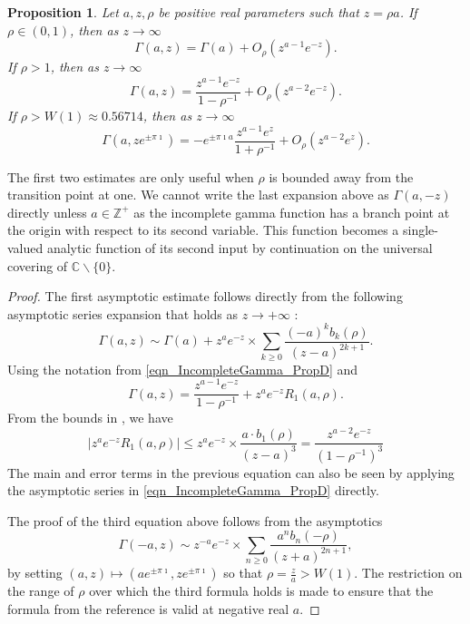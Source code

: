 \documentclass[11pt,reqno,a4letter]{article}
\numberwithin{equation}{section}
\numberwithin{figure}{section}
\numberwithin{table}{section}
\theoremstyle{plain}
\newtheorem{prop}[theorem]{Proposition}
\numberwithin{theorem}{section}
\theoremstyle{definition}
\begin{document}
\begin{prop}
\label{prop_IncGammaLambdaTypeBounds_v1}
Let $a,z,\rho$ be positive real parameters such that $z=\rho a$. 
If $\rho \in (0, 1)$, then as $z \rightarrow \infty$ 
\[
\Gamma(a, z) = \Gamma(a) + O_{\rho}\left(z^{a-1} e^{-z}\right). 
\]
If $\rho > 1$, then as 
$z \rightarrow \infty$ 
\[
\Gamma(a, z) = \frac{z^{a-1} e^{-z}}{1-\rho^{-1}} + O_{\rho}\left(z^{a-2} e^{-z}\right). 
\]
If $\rho > W(1) \approx 0.56714$, then as $z \rightarrow \infty$ 
\[
\Gamma(a, z e^{\pm\pi\imath}) = -e^{\pm \pi\imath a} \frac{z^{a-1} e^{z}}{1 + \rho^{-1}} + 
     O_{\rho}\left(z^{a-2} e^{z}\right). 
\]
\end{prop}
The first two estimates are only useful when $\rho$ is bounded away from the 
transition point at one. 
We cannot write the last expansion above 
as $\Gamma(a, -z)$ directly unless $a \in \mathbb{Z}^{+}$ 
as the incomplete gamma function 
has a branch point at the origin with respect to its second variable. 
This function becomes a single-valued 
analytic function of its second input by continuation 
on the universal covering of $\mathbb{C} \mathbin{\backslash} \{0\}$. 
\begin{proof}
The first asymptotic estimate follows directly from the following 
asymptotic series expansion that holds as $z \rightarrow +\infty$ 
\cite[Eq.\ (2.1)]{NEMES2019}: 
\[
\Gamma(a, z) \sim \Gamma(a) + z^a e^{-z} \times \sum_{k \geq 0} 
     \frac{(-a)^k b_k(\rho)}{(z-a)^{2k+1}}. 
\]
Using the notation from \eqref{eqn_IncompleteGamma_PropD} and \cite{NEMES2016} 
\[
\Gamma(a, z) = \frac{z^{a-1} e^{-z}}{1-\rho^{-1}} + z^{a} e^{-z} R_1(a, \rho). 
\]
From the bounds in \cite[\S 3.1]{NEMES2016}, we have 
\[
\left\lvert z^{a} e^{-z} R_1(a, \rho) \right\rvert \leq 
     z^a e^{-z} \times \frac{a \cdot b_1(\rho)}{(z-a)^{3}} = 
     \frac{z^{a-2} e^{-z}}{(1-\rho^{-1})^{3}}
\]
The main and error terms in the previous equation can also be 
seen by applying the asymptotic series in 
\eqref{eqn_IncompleteGamma_PropD} directly. 

The proof of the third equation above follows from the asymptotics 
\cite[Eq.\ (1.1)]{NEMES2015C}
\[
\Gamma(-a, z) \sim z^{-a} e^{-z} \times \sum_{n \geq 0} \frac{a^n b_n(-\rho)}{(z+a)^{2n+1}}, 
\]
by setting $(a, z) \mapsto \left(a e^{\pm \pi\imath}, z e^{\pm \pi\imath}\right)$ so that 
$\rho = \frac{z}{a} > W(1)$. 
The restriction on the range of $\rho$ over which the third formula holds is made to ensure that 
the formula from the reference is valid at negative real $a$. 
\end{proof}
\end{document}
